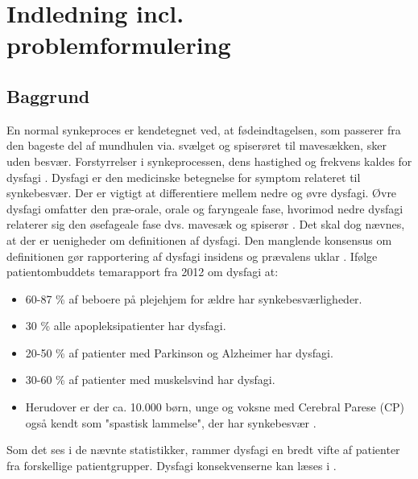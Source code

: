 \chapter{Indledning incl. problemformulering}

\section{Baggrund}
En normal synkeproces er kendetegnet ved, at fødeindtagelsen, som passerer fra den bageste del af mundhulen via. svælget og spiserøret til mavesækken, sker uden besvær. Forstyrrelser i synkeprocessen, dens hastighed og frekvens kaldes for dysfagi \cite{Sundhedsstyrelsen2015NationalDysfagi}. Dysfagi er den medicinske betegnelse for symptom relateret til synkebesvær. Der er vigtigt at differentiere mellem nedre og øvre dysfagi. Øvre dysfagi omfatter den præ-orale, orale og faryngeale fase, hvorimod nedre dysfagi relaterer sig den øsefageale fase dvs. mavesæk og spiserør \cite{KjaersgaardPh.d.studerendeDYSFAGIKonsekvenser}. Det skal dog nævnes, at der er uenigheder om definitionen af dysfagi. Den manglende konsensus om definitionen gør rapportering af dysfagi insidens og prævalens uklar \cite{KjaersgaardPh.d.studerendeDYSFAGIKonsekvenser}. Ifølge patientombuddets temarapport fra 2012 om dysfagi at:

\begin{itemize}
\item 60-87 \% af beboere på plejehjem for ældre har synkebesværligheder.
\item 30 \% alle apopleksipatienter har dysfagi.
\item 20-50 \% af patienter med Parkinson og Alzheimer har dysfagi.
\item 30-60 \% af patienter med muskelsvind har dysfagi.
\item Herudover er der ca. 10.000 børn, unge og voksne med Cerebral Parese (CP) også kendt som "spastisk lammelse", der har synkebesvær \cite{Bommersholdt2012TemarapportDysfagi}. 
\end{itemize}

Som det ses i de nævnte statistikker, rammer dysfagi en bredt vifte af patienter fra forskellige patientgrupper. Dysfagi konsekvenserne kan læses i . 

